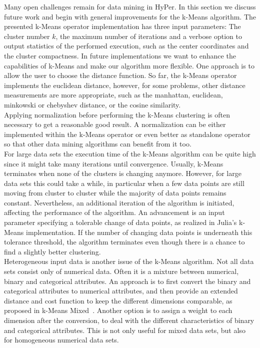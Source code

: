 Many open challenges remain for data mining in HyPer. In this section we discuss future work and begin with general improvements for the k-Means algorithm.
The presented k-Means operator implementation has three input parameters: The cluster number $k$, the maximum number of iterations and a verbose option to output statistics of the performed execution, such as the center coordinates and the cluster compactness. 
In future implementations we want to enhance the capabilities of k-Means and make our algorithm more flexible. 
One approach is to allow the user to choose the distance function. So far, the k-Means operator implements the euclidean distance, however, for some problems, other distance measurements are more appropriate, such as the manhattan, euclidean, minkowski or chebyshev distance, or the cosine similarity.
\\
Applying normalization before performing the k-Means clustering is often necessary to get a reasonable good result. A normalization can be either implemented within the k-Means operator or even better as standalone operator so that other data mining algorithms can benefit from it too.
\\
For large data sets the execution time of the k-Means algorithm can be quite high since it might take many iterations until convergence. Usually, k-Means terminates when none of the clusters is changing anymore. However, for large data sets this could take a while, in particular when a few data points are still moving from cluster to cluster while the majority of data points remains constant. Nevertheless, an additional iteration of the algorithm is initiated, affecting the performance of the algorithm. An advancement is an input parameter specifying a tolerable change of data points, as realized in Julia's k-Means implementation. If the number of changing data points is underneath this tolerance threshold, the algorithm terminates even though there is a chance to find a slightly better clustering.
\\
Heterogeneous input data is another issue of the k-Means algorithm. Not all data sets consist only of numerical data. Often it is a mixture between numerical, binary and categorical attributes. An approach is to first convert the binary and categorical attributes to numerical attributes, and then provide an extended distance and cost function to keep the different dimensions comparable, as proposed in k-Means Mixed~\parencite{ahmad2007kmean}. Another option is to assign a weight to each dimension after the conversion, to deal with the different characteristics of binary and categorical attributes. This is not only useful for mixed data sets, but also for homogeneous numerical data sets.
